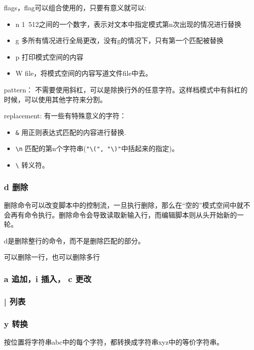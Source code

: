 flags，flag可以组合使用的，只要有意义就可以:
\begin{itemize}
\item n 1~512之间的一个数字，表示对文本中指定模式第n次出现的情况进行替换
\item g 多所有情况进行全局更改，没有g的情况下，只有第一个匹配被替换
\item p 打印模式空间的内容
\item W file，将模式空间的内容写道文件file中去。
\end{itemize}

pattern：
不需要使用斜杠，可以是除换行外的任意字符。这样档模式中有斜杠的时候，可以使用其他字符来分割。

replacement:
有一些有特殊意义的字符：
\begin{itemize}
\item \lstinline$&$ 用正则表达式匹配的内容进行替换.
\item \lstinline$\n$ 匹配的第n个字符串(\lstinline$"\(", "\)"$中括起来的指定)。
\item \lstinline$\$ 转义符。
\end{itemize}


\subsubsection{d 删除}

删除命令可以改变脚本中的控制流，一旦执行删除，那么在“空的”模式空间中就不会再有命令执行。删除命令会导致读取新输入行，而编辑脚本则从头开始新的一轮。

d是删除整行的命令，而不是删除匹配的部分。

可以删除一行，也可以删除多行

\subsubsection{a 追加，i 插入， c 更改}



\subsubsection{| 列表}

\subsubsection{y 转换}

按位置将字符串abc中的每个字符，都转换成字符串xyz中的等价字符串。




